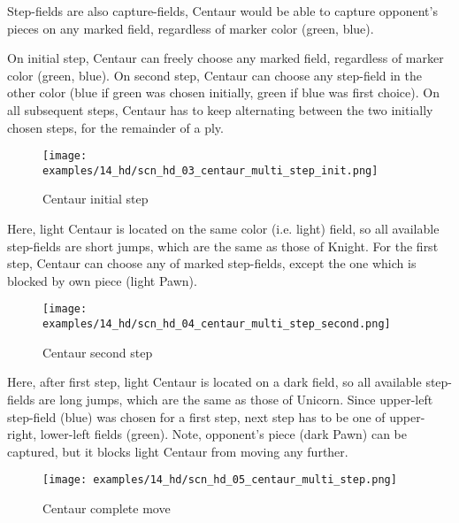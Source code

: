 Step-fields are also capture-fields, Centaur would be able to capture opponent's pieces on any
marked field, regardless of marker color (green, blue).

On initial step, Centaur can freely choose any marked field, regardless of marker color (green,
blue). On second step, Centaur can choose any step-field in the other color (blue if green was
chosen initially, green if blue was first choice). On all subsequent steps, Centaur has to keep
alternating between the two initially chosen steps, for the remainder of a ply.

\clearpage %

\noindent
\begin{figure}[!h]
\texttt{[image: examples/14\_hd/scn\_hd\_03\_centaur\_multi\_step\_init.png]}
\caption{Centaur initial step}
\label{fig:scn_hd_03_centaur_multi_step_init}
\end{figure}

Here, light Centaur is located on the same color (i.e. light) field, so all available step-fields
are short jumps, which are the same as those of Knight. For the first step, Centaur can choose any
of marked step-fields, except the one which is blocked by own piece (light Pawn).

\clearpage %

\noindent
\begin{figure}[!h]
\texttt{[image: examples/14\_hd/scn\_hd\_04\_centaur\_multi\_step\_second.png]}
\caption{Centaur second step}
\label{fig:scn_hd_04_centaur_multi_step_second}
\end{figure}

Here, after first step, light Centaur is located on a dark field, so all available step-fields are
long jumps, which are the same as those of Unicorn. Since upper-left step-field (blue) was chosen
for a first step, next step has to be one of upper-right, lower-left fields (green). Note, opponent's
piece (dark Pawn) can be captured, but it blocks light Centaur from moving any further.

\clearpage %

\noindent
\begin{figure}[!h]
\texttt{[image: examples/14\_hd/scn\_hd\_05\_centaur\_multi\_step.png]}
\caption{Centaur complete move}
\label{fig:scn_hd_05_centaur_multi_step}
\end{figure}

